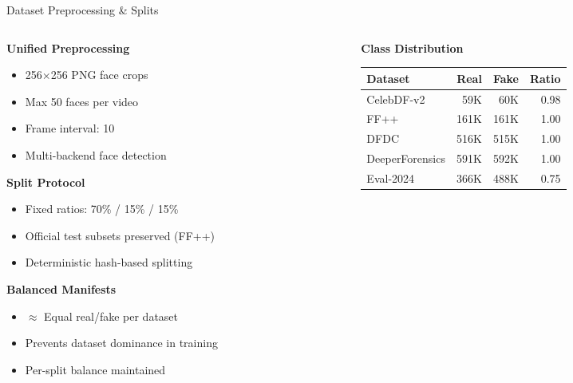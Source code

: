 \documentclass[aspectratio=169,12pt]{beamer}
\begin{document}
\begin{frame}{Dataset Preprocessing \& Splits}
\begin{columns}[T]
\begin{column}{0.5\textwidth}
\textbf{Unified Preprocessing}
\begin{itemize}
\setlength\itemsep{0.08em}
    \item 256$\times$256 PNG face crops
    \item Max 50 faces per video
    \item Frame interval: 10
    \item Multi-backend face detection
\end{itemize}

\textbf{Split Protocol}
\begin{itemize}
\setlength\itemsep{0.08em}
    \item Fixed ratios: 70\% / 15\% / 15\%
    \item Official test subsets preserved (FF++)
    \item Deterministic hash-based splitting
\end{itemize}

\textbf{Balanced Manifests}
\begin{itemize}
\setlength\itemsep{0.08em}
    \item $\approx$ Equal real/fake per dataset
    \item Prevents dataset dominance in training
    \item Per-split balance maintained
\end{itemize}
\end{column}

\begin{column}{0.5\textwidth}
\textbf{Class Distribution}
\begin{center}
\scriptsize
\begin{tabular}{lrrr}
\toprule
\textbf{Dataset} & \textbf{Real} & \textbf{Fake} & \textbf{Ratio} \\
\midrule
CelebDF-v2 & 59K & 60K & 0.98 \\
FF++ & 161K & 161K & 1.00 \\
DFDC & 516K & 515K & 1.00 \\
DeeperForensics & 591K & 592K & 1.00 \\
\midrule
Eval-2024 & 366K & 488K & 0.75 \\
\bottomrule
\end{tabular}
\end{center}


\end{column}
\end{columns}
\end{frame}
\end{document}
